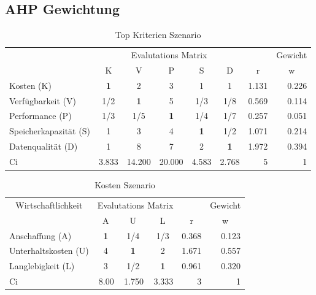 
\subsection{AHP Gewichtung}
\begin{table}[htbp]
\caption{Top Kriterien Szenario}
\begin{tabular}{|l|c|c|c|c|c|r|r|}
\hline
\multicolumn{ 1}{|c|}{} & \multicolumn{ 5}{c|}{Evalutations Matrix} & \multicolumn{1}{l|}{} & \multicolumn{1}{l|}{Gewicht} \\ \cline{ 2- 8}
\multicolumn{ 1}{|c|}{} & K & V & P & S & D & \multicolumn{1}{c|}{r} & \multicolumn{1}{c|}{w} \\ \hline
Kosten (K) & \textbf{1} & 2 & 3 & 1 & 1 & 1.131 & 0.226 \\ \hline
Verfügbarkeit (V) &  1/2 & \textbf{1} & 5 &  1/3 &  1/8 & 0.569 & 0.114 \\ \hline
Performance (P) &  1/3 &  1/5 & \textbf{1} &  1/4 &  1/7 & 0.257 & 0.051 \\ \hline
Speicherkapazität (S) & 1 & 3 & 4 & \textbf{1} &  1/2 & 1.071 & 0.214 \\ \hline
Datenqualität (D) & 1 & 8 & 7 & 2 & \textbf{1} & 1.972 & 0.394 \\ \hline  \hline
Ci & \multicolumn{1}{r|}{3.833} & \multicolumn{1}{r|}{14.200} & \multicolumn{1}{r|}{20.000} & \multicolumn{1}{r|}{4.583} & \multicolumn{1}{r|}{2.768} & 5 & 1 \\ \hline 
\end{tabular}
\label{AHPTopKriterienS}
\end{table}


\begin{table}[htbp]
\caption{Kosten Szenario}
\begin{tabular}{|l|c|c|c|r|r|}
\hline
\multicolumn{ 1}{|c|}{Wirtschaftlichkeit} & \multicolumn{ 3}{c|}{Evalutations Matrix} & \multicolumn{1}{l|}{} & \multicolumn{1}{l|}{Gewicht} \\ \cline{ 2- 6}
\multicolumn{ 1}{|c|}{} & A & U & L & \multicolumn{1}{c|}{r} & \multicolumn{1}{c|}{w} \\ \hline
Anschaffung (A) & \textbf{1} &  1/4 &  1/3 & 0.368 & 0.123 \\ \hline
Unterhaltskosten (U)  & 4 & \textbf{1} & 2 & 1.671 & 0.557 \\ \hline
Langlebigkeit (L) & 3 &  1/2 & \textbf{1} & 0.961 & 0.320 \\ \hline \hline 
Ci & \multicolumn{1}{r|}{8.00} & \multicolumn{1}{r|}{1.750} & \multicolumn{1}{r|}{3.333} & 3 & 1 \\ \hline
\end{tabular}
\label{AHPKostenS}
\end{table}

